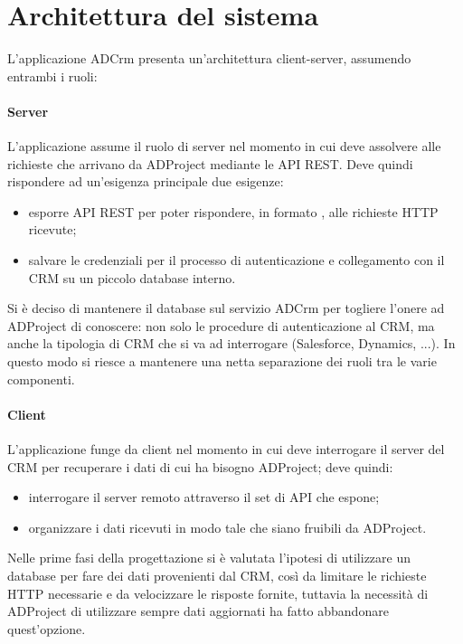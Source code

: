 \section{Architettura del sistema}
L'applicazione ADCrm presenta un'architettura client-server, assumendo entrambi i ruoli:
\paragraph{Server}
L'applicazione assume il ruolo di server nel momento in cui deve assolvere alle richieste che arrivano da ADProject mediante le API REST. Deve quindi rispondere ad un'esigenza principale due esigenze:
\begin{itemize}
	\item esporre API REST per poter rispondere, in formato , alle richieste HTTP ricevute;
	\item salvare le credenziali per il processo di autenticazione e collegamento con il CRM su un piccolo database interno.
\end{itemize} 

Si è deciso di mantenere il database sul servizio ADCrm per togliere l'onere ad ADProject di conoscere: non solo le procedure di autenticazione al CRM, ma anche la tipologia di CRM che si va ad interrogare (Salesforce, Dynamics, ...). In questo modo si riesce a mantenere una netta separazione dei ruoli tra le varie componenti. 

\paragraph{Client}
L'applicazione funge da client nel momento in cui deve interrogare il server del CRM per recuperare i dati di cui ha bisogno ADProject; deve quindi:
\begin{itemize}
	\item interrogare il server remoto attraverso il set di API che espone;
	\item organizzare i dati ricevuti in modo tale che siano fruibili da ADProject.
\end{itemize}

Nelle prime fasi della progettazione si è valutata l'ipotesi di utilizzare un database per fare  dei dati provenienti dal CRM, così da limitare le richieste HTTP necessarie e da velocizzare le risposte fornite, tuttavia la necessità di ADProject di utilizzare sempre dati aggiornati ha fatto abbandonare quest'opzione.\\

